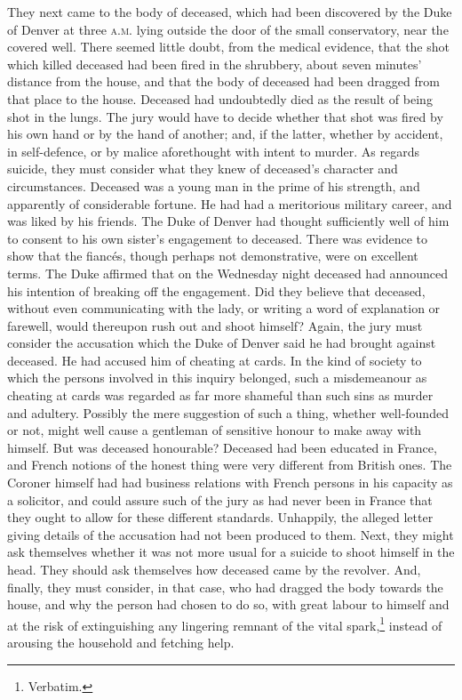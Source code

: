 They next came to the body of deceased, which had been discovered by the Duke of Denver at three \textsc{a.m.} lying outside the door of the small conservatory, near the covered well. There seemed little doubt, from the medical evidence, that the shot which killed deceased had been fired in the shrubbery, about seven minutes' distance from the house, and that the body of deceased had been dragged from that place to the house. Deceased had undoubtedly died as the result of being shot in the lungs. The jury would have to decide whether that shot was fired by his own hand or by the hand of another; and, if the latter, whether by accident, in self-defence, or by malice aforethought with intent to murder. As regards suicide, they must consider what they knew of deceased's character and circumstances. Deceased was a young man in the prime of his strength, and apparently of considerable fortune. He had had a meritorious military career, and was liked by his friends. The Duke of Denver had thought sufficiently well of him to consent to his own sister's engagement to deceased. There was evidence to show that the fiancés, though perhaps not demonstrative, were on excellent terms.  The Duke affirmed that on the Wednesday night deceased had announced his intention of breaking off the engagement. Did they believe that deceased, without even communicating with the lady, or writing a word of explanation or farewell, would thereupon rush out and shoot himself?  Again, the jury must consider the accusation which the Duke of Denver said he had brought against deceased. He had accused him of cheating at cards. In the kind of society to which the persons involved in this inquiry belonged, such a misdemeanour as cheating at cards was regarded as far more shameful than such sins as murder and adultery.  Possibly the mere suggestion of such a thing, whether well-founded or not, might well cause a gentleman of sensitive honour to make away with himself. But was deceased honourable? Deceased had been educated in France, and French notions of the honest thing were very different from British ones. The Coroner himself had had business relations with French persons in his capacity as a solicitor, and could assure such of the jury as had never been in France that they ought to allow for these different standards. Unhappily, the alleged letter giving details of the accusation had not been produced to them. Next, they might ask themselves whether it was not more usual for a suicide to shoot himself in the head. They should ask themselves how deceased came by the revolver. And, finally, they must consider, in that case, who had dragged the body towards the house, and why the person had chosen to do so, with great labour to himself and at the risk of extinguishing any lingering remnant of the vital spark,\footnote{Verbatim.} instead of arousing the household and fetching help.

